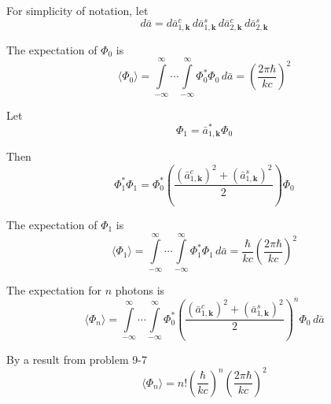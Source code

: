 \documentclass[12pt]{article}
\begin{document}
For simplicity of notation, let
\begin{equation*}
d\bar a=
d\bar a_{1,\mathbf k}^c\,d\bar a_{1,\mathbf k}^s
\,d\bar a_{2,\mathbf k}^c\,d\bar a_{2,\mathbf k}^s
\end{equation*}

The expectation of $\Phi_0$ is
\begin{equation*}
\langle\Phi_0\rangle=
\int\limits_{-\infty}^\infty\cdots
\int\limits_{-\infty}^\infty
\Phi_0^*\Phi_0
\,d\bar a
=\left(\frac{2\pi\hbar}{kc}\right)^2
\tag{1}
\end{equation*}

Let
\begin{equation*}
\Phi_1=\bar a_{1,\mathbf k}^*\Phi_0
\end{equation*}

Then
\begin{equation*}
\Phi_1^*\Phi_1=\Phi_0^*\left(\frac{(\bar a_{1,\mathbf k}^c)^2+(\bar a_{1,\mathbf k}^s)^2}{2}\right)\Phi_0
\end{equation*}

The expectation of $\Phi_1$ is
\begin{equation*}
\langle\Phi_1\rangle=
\int\limits_{-\infty}^\infty\cdots
\int\limits_{-\infty}^\infty
\Phi_1^*\Phi_1
\,d\bar a
=\frac{\hbar}{kc}
\left(\frac{2\pi\hbar}{kc}\right)^2
\tag{2}
\end{equation*}

The expectation for $n$ photons is
\begin{equation*}
\langle\Phi_n\rangle=
\int\limits_{-\infty}^\infty\cdots
\int\limits_{-\infty}^\infty
\Phi_0^*\left(\frac{(\bar a_{1,\mathbf k}^c)^2+(\bar a_{1,\mathbf k}^s)^2}{2}\right)^n\Phi_0
\,d\bar a
\end{equation*}

By a result from problem 9-7
\begin{equation*}
\langle\Phi_n\rangle=n!\left(\frac{\hbar}{kc}\right)^n
\left(\frac{2\pi\hbar}{kc}\right)^2
\tag{3}
\end{equation*}
\end{document}
